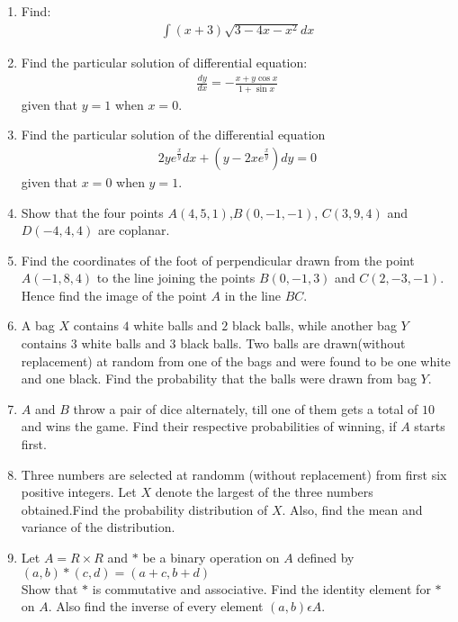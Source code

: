\documentclass[12pt,-letter paper]{article}
\providecommand{\brak}[1]{\ensuremath{\left(#1\right)}}
\begin{document}
 \begin{enumerate}


    \item Find:\begin{align*}
    \int{\brak{x+3}}\sqrt{3-4x-x^2}dx 
    \end{align*}

    \item Find the particular solution of differential equation:\begin{align*} 
	\frac{dy}{dx}=-\frac{x+y\cos x}{1+\sin x}
    \end{align*} given that $y=1$ when $x=0$.

	    \item Find the particular solution of the differential equation\begin{align*} 
 2ye^\frac{x}{y}dx+\brak{{y-2xe^\frac{x}{y}}}dy=0 
	    \end{align*}
		 given that $x=0$  when $y=1$.

		    \item Show that the four points $A\brak{4,5,1}$,$B\brak{0,-1,-1}$, $C\brak{3,9,4}$ and $D\brak{-4,4,4}$ are coplanar.

		    \item Find the coordinates of the foot of perpendicular drawn from the point $A\brak{-1,8,4}$ to the line joining the points $B\brak{0,-1,3}$ and $C\brak{2,-3,-1}$. Hence find the image of the point $A$ in the line $BC$.
		    \item A bag $X$ contains $4$ white balls and $2$ black balls, while another bag $Y$ contains $3$ white balls and $3$ black balls. Two balls are drawn(without replacement) at random from one of the bags and were found to be one white and one black. Find the probability that the balls were drawn from bag $Y$.

    \item $A$ and $B$ throw a pair of dice alternately,     till one of them gets a total of $10$ and wins the game. Find their respective probabilities of winning, if $A$ starts first.

    \item Three numbers are selected at randomm (without replacement) from first six positive integers. Let $X$ denote the largest of the three numbers obtained.Find the probability distribution of $X$. Also, find the mean and variance of the distribution.
		          
    \item Let $A=R\times R$ and $*$ be a binary operation on $A$ defined by\\ $\brak{a,b}*\brak{c,d}=\brak{a+c,b+d}$\\
		          Show that $*$ is commutative and associative. Find the identity element for $*$ on $A$. Also find the inverse of every element $\brak{a,b}\epsilon A$.


\end{enumerate}
\end{document}
